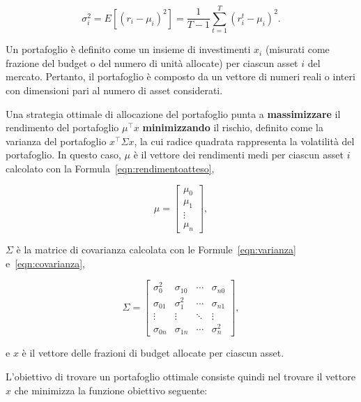\begin{equation}\label{eqn:covarianza}
    \sigma_i^2 = E[{(r_i - \mu_i)}^2] = \frac{1}{T-1} \sum_{t=1}^T {(r_i^t - \mu_i)}^2. 
\end{equation}

Un portafoglio è definito come un insieme di investimenti \(x_i\) (misurati come frazione 
del budget o del numero di unità allocate) per ciascun asset \(i\) del mercato. Pertanto, 
il portafoglio è composto da un vettore di numeri reali o interi con dimensioni pari al 
numero di asset considerati. 

Una strategia ottimale di allocazione del portafoglio punta 
a \textbf{massimizzare} il rendimento del portafoglio \(\mu^\top x\) \textbf{minimizzando} 
il rischio, definito come la varianza del portafoglio \(x^\top \Sigma x\), la cui 
radice quadrata rappresenta la volatilità del portafoglio. In questo caso, 
\(\mu\) è il vettore dei rendimenti medi per ciascun asset \(i\) calcolato con la 
Formula~\ref{eqn:rendimentoatteso}, 

\begin{equation}\label{eqn:matriceRendimentiAttesi}
    \mu =
    \begin{bmatrix}
    \mu_0 \\
    \mu_1 \\
    \vdots \\
    \mu_n
    \end{bmatrix},
\end{equation}

\(\Sigma\) è la matrice di covarianza calcolata con le Formule~\ref{eqn:varianza} 
e~\ref{eqn:covarianza}, 

\begin{equation}\label{eqn:matriceCovarianza}
    \Sigma =
    \begin{bmatrix}
    \sigma_0^2 & \sigma_{10} & \cdots & \sigma_{n0} \\
    \sigma_{01} & \sigma_1^2 & \cdots & \sigma_{n1} \\
    \vdots & \vdots & \ddots & \vdots \\
    \sigma_{0n} & \sigma_{1n} & \cdots & \sigma_n^2
    \end{bmatrix},
\end{equation}

e \(x\) è il vettore delle frazioni di budget allocate per ciascun asset. 

L'obiettivo di trovare un portafoglio ottimale consiste 
quindi nel trovare il vettore \(x\) che minimizza la funzione obiettivo seguente:

